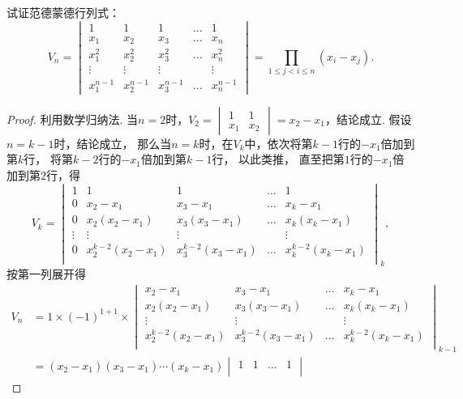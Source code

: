 \begin{example}
试证范德蒙德行列式：
\begin{equation}\label{equation:行列式.范德蒙德行列式}
V_n = \begin{vmatrix}
1 & 1 & 1 & \dots & 1 \\
x_1 & x_2 & x_3 & \dots & x_n \\
x_1^2 & x_2^2 & x_3^2 & \dots & x_n^2 \\
\vdots & \vdots & \vdots& & \vdots \\
x_1^{n-1} & x_2^{n-1} & x_3^{n-1} & \dots & x_n^{n-1}
\end{vmatrix}=\prod\limits_{1 \leqslant j < i \leqslant n}{(x_i-x_j)}.
\end{equation}
\begin{proof}
利用数学归纳法.
当\(n=2\)时，\(V_2 = \begin{vmatrix}
	1 & 1 \\ x_1 & x_2
\end{vmatrix} = x_2 - x_1\)，结论成立.
假设\(n=k-1\)时，结论成立，%
那么当\(n=k\)时，在\(V_k\)中，依次将第\(k-1\)行的\(-x_1\)倍加到第\(k\)行，%
将第\(k-2\)行的\(-x_1\)倍加到第\(k-1\)行，%
以此类推，%
直至把第\(1\)行的\(-x_1\)倍加到第\(2\)行，得\[
V_k = \begin{vmatrix}
1 & 1 & 1 & \dots & 1 \\
0 & x_2 - x_1 & x_3 - x_1 & \dots & x_k - x_1 \\
0 & x_2(x_2 - x_1) & x_3(x_3 - x_1) & \dots & x_k(x_k - x_1) \\
\vdots & \vdots & \vdots & & \vdots \\
0 & x_2^{k-2}(x_2 - x_1) & x_3^{k-2}(x_3 - x_1) & \dots & x_k^{k-2}(x_k - x_1) \\
\end{vmatrix}_k,
\]按第一列展开得\begin{align*}
V_n &= 1 \times (-1)^{1+1} \times \begin{vmatrix}
x_2 - x_1 & x_3 - x_1 & \dots & x_k - x_1 \\
x_2(x_2 - x_1) & x_3(x_3 - x_1) & \dots & x_k(x_k - x_1) \\
\vdots & \vdots & & \vdots \\
x_2^{k-2}(x_2 - x_1) & x_3^{k-2}(x_3 - x_1) & \dots & x_k^{k-2}(x_k - x_1) \\
\end{vmatrix}_{k-1} \\
&= (x_2 - x_1)(x_3 - x_1)\dotsm(x_k - x_1) \begin{vmatrix}
1 & 1 & \dots & 1 \\

\end{vmatrix}
\end{align*}
\end{proof}
\end{example}
